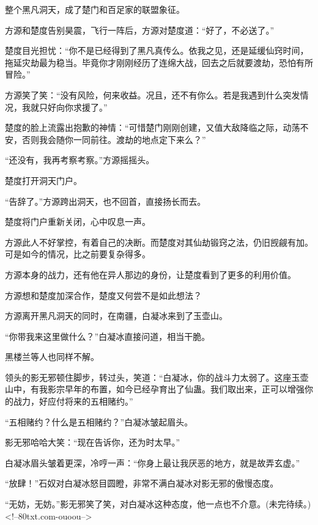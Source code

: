 \begin{this_body}
整个黑凡洞天，成了楚门和百足家的联盟象征。

方源和楚度告别昊震，飞行一阵后，方源对楚度道：“好了，不必送了。”

楚度目光担忧：“你不是已经得到了黑凡真传么。依我之见，还是延缓仙窍时间，拖延灾劫最为稳当。毕竟你才刚刚经历了连绵大战，回去之后就要渡劫，恐怕有所冒险。”

方源笑了笑：“没有风险，何来收益。况且，还不有你么。若是我遇到什么突发情况，我就只好向你求援了。”

楚度的脸上流露出抱歉的神情：“可惜楚门刚刚创建，又值大敌降临之际，动荡不安，否则我会随你一同前往。渡劫的地点定下来么？”

“还没有，我再考察考察。”方源摇摇头。

楚度打开洞天门户。

“告辞了。”方源跨出洞天，也不回首，直接扬长而去。

楚度将门户重新关闭，心中叹息一声。

方源此人不好掌控，有着自己的决断。而楚度对其仙劫锻窍之法，仍旧觊觎有加。可是如今的情况，比之前要复杂得多。

方源本身的战力，还有他在异人那边的身份，让楚度看到了更多的利用价值。

方源想和楚度加深合作，楚度又何尝不是如此想法？

方源离开黑凡洞天的同时，在南疆，白凝冰来到了玉壶山。

“你带我来这里做什么？”白凝冰直接问道，相当干脆。

黑楼兰等人也同样不解。

领头的影无邪顿住脚步，转过头，笑道：“白凝冰，你的战斗力太弱了。这座玉壶山中，有我影宗早年的布置，如今已经孕育出了仙蛊。我们取出来，正可以增强你的战力，好应付将来的五相赌约。”

“五相赌约？什么是五相赌约？”白凝冰皱起眉头。

影无邪哈哈大笑：“现在告诉你，还为时太早。”

白凝冰眉头皱着更深，冷哼一声：“你身上最让我厌恶的地方，就是故弄玄虚。”

“放肆！”石奴对白凝冰怒目圆瞪，非常不满白凝冰对影无邪的傲慢态度。

“无妨，无妨。”影无邪笑了笑，对白凝冰这种态度，他一点也不介意。(未完待续。)<!--80txt.com-ouoou-->

\end{this_body}

